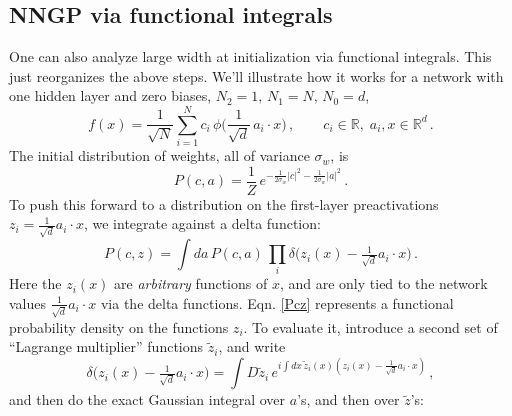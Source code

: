 \documentclass[11pt]{article}
\newcommand{\R}{\mathbb{R}}
\begin{document}
\subsection{NNGP via functional integrals}
\label{sec:NNGP-int}

One can also analyze large width at initialization via functional integrals. This just reorganizes the above steps. We'll illustrate how it works for a network with one hidden layer and zero biases, $N_2=1,\,N_1=N,\,N_0=d$,
%
\begin{equation}
    f(x) = \frac{1}{\sqrt N}\sum_{i=1}^N c_i\,\phi\Big(\frac{1}{\sqrt d}\,a_i\cdot x\Big)\,,\qquad c_i\in \R,\;a_i,x\in \R^d\,.
\end{equation}
%
The initial distribution of weights, all of variance $\sigma_w$, is
%
\begin{equation}
    P(c,a) = \frac{1}{Z}\,e^{\textstyle -\frac{1}{2\sigma_w}|c|^2-\frac{1}{2\sigma_w}|a|^2}\,.
\end{equation}
%
To push this forward to a distribution on the first-layer preactivations $z_i=\frac{1}{\sqrt d}a_i\cdot x$, we integrate against a delta function:
%
\begin{equation}
   P(c,z)= \int da\, P(c,a)\,\prod_i\delta\Big(z_i(x)-\tfrac{1}{\sqrt d}a_i\cdot x\Big)\,. \label{Pcz}
\end{equation}
%
Here the $z_i(x)$ are \emph{arbitrary} functions of $x$, and are only tied to the network values $\frac{1}{\sqrt d}a_i\cdot x$ via the delta functions. Eqn. \eqref{Pcz} represents a functional probability density on the functions $z_i$. To evaluate it, introduce a second set of ``Lagrange multiplier'' functions $\tilde z_i$, and write
%
\begin{equation}
    \delta\Big(z_i(x)-\tfrac{1}{\sqrt d}a_i\cdot x\Big) = \int D\tilde z_i\,  e^{\textstyle i \int dx\, \tilde z_i(x) (z_i(x)-\frac{1}{\sqrt d}a_i\cdot x)}\,,
\end{equation}
%
and then do the exact Gaussian integral over $a$'s, and then over $\tilde z$'s:
%
\end{document}
